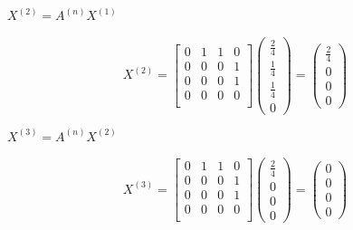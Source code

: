 \documentclass{amsart}
\theoremstyle{definition}
\theoremstyle{remark}
\numberwithin{equation}{section}
\begin{document}
\begin{enumerate}
\begin{enumerate}
$X^{\left(2\right)} = A^{\left(n\right)}X^{\left(1\right)}$ \vspace{0.2cm}

\begin{equation*}
    X^{\left(2\right)}  = \left\lbrack\begin{array}{cccc}
    0 & 1 & 1 & 0 \\
    0 & 0 & 0 & 1 \\
    0 & 0 & 0 & 1 \\
    0 & 0 & 0 & 0 \\
    \end{array}\right\rbrack
    \begin{pmatrix} 
        \frac{2}{4} \\ 
        \frac{1}{4} \\ 
        \frac{1}{4} \\ 
        0
    \end{pmatrix}
    =
    \begin{pmatrix} 
        \frac{2}{4} \\ 
        0 \\ 
        0 \\ 
        0
    \end{pmatrix}
\end{equation*}

$X^{\left(3\right)} = A^{\left(n\right)}X^{\left(2\right)}$ \vspace{0.2cm}

\begin{equation*}
    X^{\left(3\right)}  = \left\lbrack\begin{array}{cccc}
    0 & 1 & 1 & 0 \\
    0 & 0 & 0 & 1 \\
    0 & 0 & 0 & 1 \\
    0 & 0 & 0 & 0 \\
    \end{array}\right\rbrack
    \begin{pmatrix} 
        \frac{2}{4} \\ 
        0 \\ 
        0 \\ 
        0
    \end{pmatrix}
    =
    \begin{pmatrix} 
        0 \\ 
        0 \\ 
        0 \\ 
        0
    \end{pmatrix}
\end{equation*}



\end{enumerate}
\end{enumerate}
\end{document}
